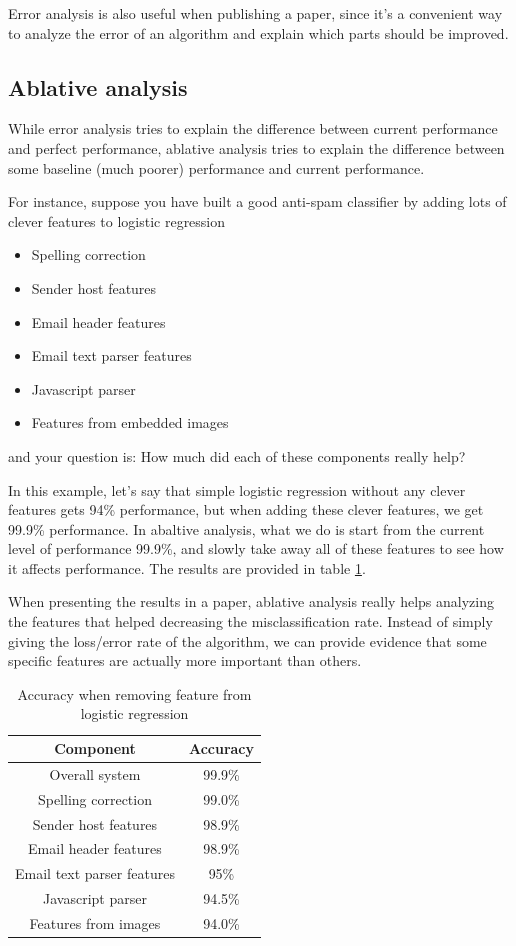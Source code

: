 \documentclass[12pt]{article}
\begin{document}
Error analysis is also useful when publishing a paper, since it's a convenient way to analyze the error of an algorithm and explain which parts should be improved.

\subsection*{Ablative analysis}

While error analysis tries to explain the difference between current performance and perfect performance, ablative analysis tries to explain the difference between some baseline (much poorer) performance and current performance.

For instance, suppose you have built a good anti-spam classifier by adding lots of clever features to logistic regression
\begin{itemize}
	\item Spelling correction
	\item Sender host features
	\item Email header features
	\item Email text parser features
	\item Javascript parser
	\item Features from embedded images
\end{itemize}
and your question is: How much did each of these components really help?

In this example, let's say that simple logistic regression without any clever features gets 94\% performance, but when adding these clever features, we get 99.9\% performance. In abaltive analysis, what we do is start from the current level of performance 99.9\%, and slowly take away all of these features to see how it affects performance. The results are provided in table \ref{ablative_analysis}.

When presenting the results in a paper, ablative analysis really helps analyzing the features that helped decreasing the misclassification rate. Instead of simply giving the loss/error rate of the algorithm, we can provide evidence that some specific features are actually more important than others.

\begin{table}[h!]
	\centering
	\begin{tabular}{|c|c|}
		\hline
		\textbf{Component} & \textbf{Accuracy} \\
		\hline
		Overall system & 99.9\% \\
		\hline
		Spelling correction & 99.0\% \\
		\hline
		Sender host features & 98.9\% \\
		\hline
		Email header features & 98.9\% \\
		\hline
		Email text parser features & 95\% \\
		\hline
		Javascript parser & 94.5\% \\
		\hline
		Features from images & 94.0\% \\
		\hline
	\end{tabular}
	\caption{Accuracy when removing feature from logistic regression}
	\label{ablative_analysis}
\end{table}
\end{document}
